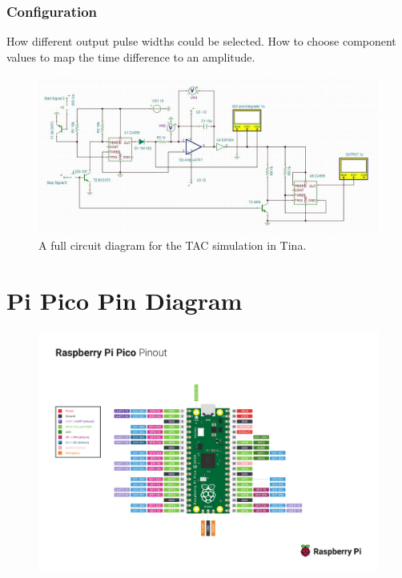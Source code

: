 \documentclass[%
 reprint,
 amsmath,amssymb,
 aps,
]{revtex4-2}
\begin{document}
        \subsubsection{Configuration}
        How different output pulse widths could be selected. How to choose component values to map the time difference to an amplitude.

            
            \begin{figure}
                \includegraphics[width=2\columnwidth]{Images/tac}
                \caption{\label{fig:tac}A full circuit diagram for the TAC simulation in Tina.}
            \end{figure}
    


\clearpage


\clearpage
\onecolumngrid
\appendix

\section{Pi Pico Pin Diagram}

    \begin{figure}[h]
        \includegraphics[width=\columnwidth]{Images/Pico-R3-A4-Pinout.pdf}
    \end{figure}
\end{document}
